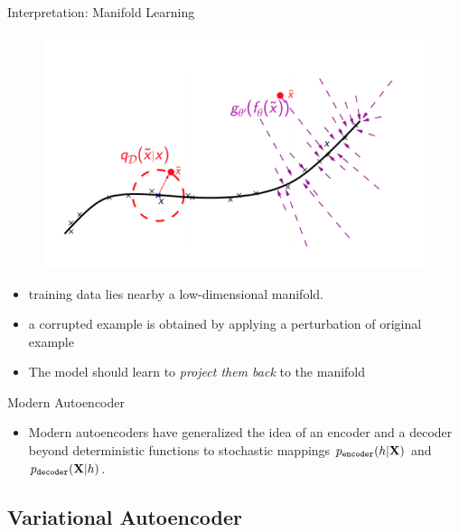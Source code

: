 \documentclass[handout,xcolor=pdftex,dvipsnames,table,mathserif]{beamer}
\begin{document}
\begin{frame}{Interpretation: Manifold Learning}
\begin{figure}
\includegraphics[width=.5\columnwidth]{../graphics/Manifold}
\end{figure}
\begin{itemize}
\item training data lies nearby a low-dimensional manifold.
\item a corrupted example is obtained by applying a perturbation of original example
\item The model should learn to \emph{project them back} to the manifold
\end{itemize}
\end{frame}


\begin{frame}{Modern Autoencoder}
\begin{itemize}
\item Modern autoencoders have generalized the idea of an encoder and a decoder
beyond deterministic functions to stochastic mappings
$p_{\texttt{encoder}}(h|\mathbf{X})$ and $p_{\texttt{decoder}}(\mathbf{X}|h)$.
\end{itemize}
\end{frame}


\subsection{Variational Autoencoder}
\end{document}

